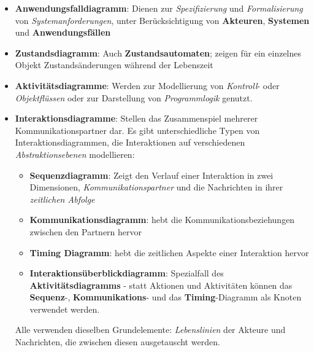 \begin{itemize}
    \item \textbf{Anwendungsfalldiagramm}: Dienen zur \textit{Spezifizierung} und \textit{Formalisierung} von \textit{Systemanforderungen}, unter Berücksichtigung von \textbf{Akteuren}, \textbf{Systemen} und \textbf{Anwendungsfällen}
    \item \textbf{Zustandsdiagramm}: Auch \textbf{Zustandsautomaten}; zeigen für ein einzelnes Objekt Zustandsänderungen während der Lebenszeit
    \item \textbf{Aktivitätsdiagramme}: Werden zur Modellierung von \textit{Kontroll}- oder \textit{Objektflüssen} oder zur Darstellung von \textit{Programmlogik} genutzt.
    \item \textbf{Interaktionsdiagramme}: Stellen das Zusammenspiel mehrerer Kommunikationspartner dar.
    Es gibt unterschiedliche Typen von Interaktionsdiagrammen, die Interaktionen auf verschiedenen \textit{Abstraktionsebenen} modellieren:
    \begin{itemize}
        \item \textbf{Sequenzdiagramm}: Zeigt den Verlauf einer Interaktion in zwei Dimensionen, \textit{Kommunikationspartner} und die Nachrichten in ihrer \textit{zeitlichen Abfolge}
        \item \textbf{Kommunikationsdiagramm}: hebt die Kommunikationsbeziehungen zwischen den Partnern hervor
        \item \textbf{Timing Diagramm}: hebt die zeitlichen Aspekte einer Interaktion hervor
        \item \textbf{Interaktionsüberblickdiagramm}: Spezialfall des \textbf{Aktivitätsdiagramms} - statt Aktionen und Aktivitäten können das \textbf{Sequenz}-, \textbf{Kommunikations}- und das \textbf{Timing}-Diagramm als Knoten verwendet werden.
    \end{itemize}
    Alle verwenden dieselben Grundelemente: \textit{Lebenslinien} der Akteure und Nachrichten, die zwischen diesen ausgetauscht werden.

\end{itemize}
